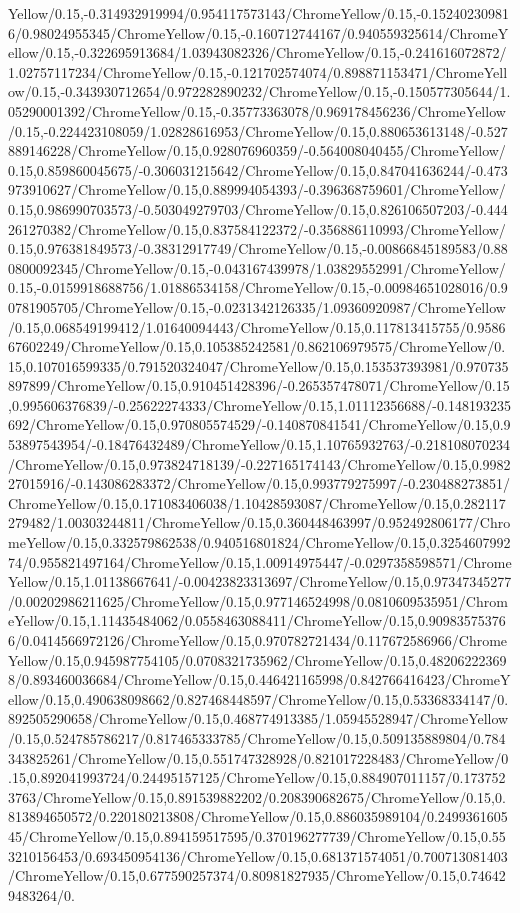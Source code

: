 {\begin{tikzternal}
{Yellow/0.15,-0.314932919994/0.954117573143/ChromeYellow/0.15,-0.152402309816/0.98024955345/ChromeYellow/0.15,-0.160712744167/0.940559325614/ChromeYellow/0.15,-0.322695913684/1.03943082326/ChromeYellow/0.15,-0.241616072872/1.02757117234/ChromeYellow/0.15,-0.121702574074/0.898871153471/ChromeYellow/0.15,-0.343930712654/0.972282890232/ChromeYellow/0.15,-0.150577305644/1.05290001392/ChromeYellow/0.15,-0.35773363078/0.969178456236/ChromeYellow/0.15,-0.224423108059/1.02828616953/ChromeYellow/0.15,0.880653613148/-0.527889146228/ChromeYellow/0.15,0.928076960359/-0.564008040455/ChromeYellow/0.15,0.859860045675/-0.306031215642/ChromeYellow/0.15,0.847041636244/-0.473973910627/ChromeYellow/0.15,0.889994054393/-0.396368759601/ChromeYellow/0.15,0.986990703573/-0.503049279703/ChromeYellow/0.15,0.826106507203/-0.444261270382/ChromeYellow/0.15,0.837584122372/-0.356886110993/ChromeYellow/0.15,0.976381849573/-0.38312917749/ChromeYellow/0.15,-0.00866845189583/0.880800092345/ChromeYellow/0.15,-0.043167439978/1.03829552991/ChromeYellow/0.15,-0.0159918688756/1.01886534158/ChromeYellow/0.15,-0.00984651028016/0.90781905705/ChromeYellow/0.15,-0.0231342126335/1.09360920987/ChromeYellow/0.15,0.068549199412/1.01640094443/ChromeYellow/0.15,0.117813415755/0.958667602249/ChromeYellow/0.15,0.105385242581/0.862106979575/ChromeYellow/0.15,0.107016599335/0.791520324047/ChromeYellow/0.15,0.153537393981/0.970735897899/ChromeYellow/0.15,0.910451428396/-0.265357478071/ChromeYellow/0.15,0.995606376839/-0.25622274333/ChromeYellow/0.15,1.01112356688/-0.148193235692/ChromeYellow/0.15,0.970805574529/-0.140870841541/ChromeYellow/0.15,0.953897543954/-0.18476432489/ChromeYellow/0.15,1.10765932763/-0.218108070234/ChromeYellow/0.15,0.973824718139/-0.227165174143/ChromeYellow/0.15,0.998227015916/-0.143086283372/ChromeYellow/0.15,0.993779275997/-0.230488273851/ChromeYellow/0.15,0.171083406038/1.10428593087/ChromeYellow/0.15,0.282117279482/1.00303244811/ChromeYellow/0.15,0.360448463997/0.952492806177/ChromeYellow/0.15,0.332579862538/0.940516801824/ChromeYellow/0.15,0.325460799274/0.955821497164/ChromeYellow/0.15,1.00914975447/-0.0297358598571/ChromeYellow/0.15,1.01138667641/-0.00423823313697/ChromeYellow/0.15,0.97347345277/0.00202986211625/ChromeYellow/0.15,0.977146524998/0.0810609535951/ChromeYellow/0.15,1.11435484062/0.0558463088411/ChromeYellow/0.15,0.909835753766/0.0414566972126/ChromeYellow/0.15,0.970782721434/0.117672586966/ChromeYellow/0.15,0.945987754105/0.0708321735962/ChromeYellow/0.15,0.482062223698/0.893460036684/ChromeYellow/0.15,0.446421165998/0.842766416423/ChromeYellow/0.15,0.490638098662/0.827468448597/ChromeYellow/0.15,0.53368334147/0.892505290658/ChromeYellow/0.15,0.468774913385/1.05945528947/ChromeYellow/0.15,0.524785786217/0.817465333785/ChromeYellow/0.15,0.509135889804/0.784343825261/ChromeYellow/0.15,0.551747328928/0.821017228483/ChromeYellow/0.15,0.892041993724/0.24495157125/ChromeYellow/0.15,0.884907011157/0.1737523763/ChromeYellow/0.15,0.891539882202/0.208390682675/ChromeYellow/0.15,0.813894650572/0.220180213808/ChromeYellow/0.15,0.886035989104/0.249936160545/ChromeYellow/0.15,0.894159517595/0.370196277739/ChromeYellow/0.15,0.553210156453/0.693450954136/ChromeYellow/0.15,0.681371574051/0.700713081403/ChromeYellow/0.15,0.677590257374/0.80981827935/ChromeYellow/0.15,0.746429483264/0.}
\end{tikzternal}}
